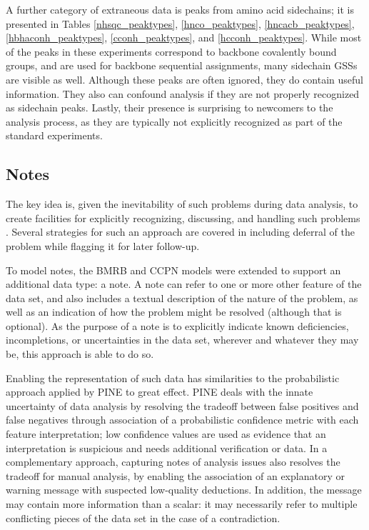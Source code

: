 A further category of extraneous data is peaks from amino acid sidechains; 
it is presented in Tables \ref{nhsqc_peaktypes}, \ref{hnco_peaktypes}, 
\ref{hncacb_peaktypes}, \ref{hbhaconh_peaktypes}, \ref{cconh_peaktypes}, and
\ref{hcconh_peaktypes}.  While most of the
peaks in these experiments correspond to backbone covalently bound groups, 
and are used for backbone sequential assignments, many sidechain GSSs are
visible as well.  Although these peaks are often ignored, they do contain
useful information.  They also can confound analysis if they are not properly
recognized as sidechain peaks.  Lastly, their presence is surprising to 
newcomers to the analysis process, as they are typically not explicitly 
recognized as part of the standard experiments.



\subsection*{Notes}
The key idea is, given the inevitability of such problems during data
analysis, to create facilities for explicitly recognizing, discussing, 
and handling such problems \cite{robillard2007concerns}. 
Several strategies for such an approach 
are covered in \cite{nuseibeh2000inconsistency} including deferral of the
problem while flagging it for later follow-up.

To model notes, the BMRB and CCPN models \cite{bmrb, ccpn} were extended
to support an additional data type: a note.  A note can refer to one or more
other feature of the data set, and also includes a textual description of
the nature of the problem, as well as an indication of how the problem might
be resolved (although that is optional).  As the purpose of a note is to
explicitly indicate known deficiencies, incompletions, or uncertainties in 
the data set, wherever and whatever they may be, this approach is able to do
so.

Enabling the representation of such data has similarities to the probabilistic
approach applied by PINE \cite{pine} to great effect.  
PINE deals with the innate uncertainty of data 
analysis by resolving the tradeoff between false positives and false 
negatives through association of a probabilistic confidence metric with each
feature interpretation; low confidence values are used as evidence that an
interpretation is suspicious and needs additional verification or data.
In a complementary approach, capturing notes of analysis issues also 
resolves the tradeoff for manual analysis, by enabling the association of
an explanatory or warning message with suspected low-quality deductions.
In addition, the message may contain more information than a scalar: it may
necessarily refer to multiple conflicting pieces of the data set in the case
of a contradiction.




